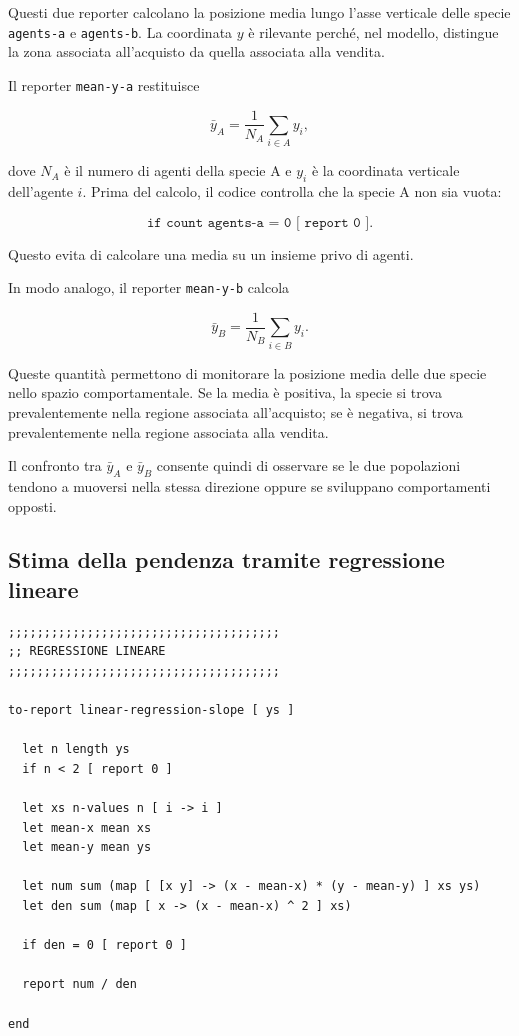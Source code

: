 Questi due reporter calcolano la posizione media lungo l'asse verticale delle
specie \texttt{agents-a} e \texttt{agents-b}. La coordinata \(y\) è rilevante
perché, nel modello, distingue la zona associata all'acquisto da quella associata
alla vendita.

Il reporter \texttt{mean-y-a} restituisce

\[
\bar{y}_A =
\frac{1}{N_A}
\sum_{i \in A} y_i,
\]

dove \(N_A\) è il numero di agenti della specie A e \(y_i\) è la coordinata
verticale dell'agente \(i\). Prima del calcolo, il codice controlla che la specie
A non sia vuota:

\[
\texttt{if count agents-a = 0 [ report 0 ]}.
\]

Questo evita di calcolare una media su un insieme privo di agenti.

In modo analogo, il reporter \texttt{mean-y-b} calcola

\[
\bar{y}_B =
\frac{1}{N_B}
\sum_{i \in B} y_i.
\]

Queste quantità permettono di monitorare la posizione media delle due specie
nello spazio comportamentale. Se la media è positiva, la specie si trova
prevalentemente nella regione associata all'acquisto; se è negativa, si trova
prevalentemente nella regione associata alla vendita.

Il confronto tra \(\bar{y}_A\) e \(\bar{y}_B\) consente quindi di osservare se le
due popolazioni tendono a muoversi nella stessa direzione oppure se sviluppano
comportamenti opposti.

\subsection{Stima della pendenza tramite regressione lineare}

\begin{lstlisting}[caption={Reporter per il calcolo della pendenza di una regressione lineare}]
;;;;;;;;;;;;;;;;;;;;;;;;;;;;;;;;;;;;;;
;; REGRESSIONE LINEARE
;;;;;;;;;;;;;;;;;;;;;;;;;;;;;;;;;;;;;;

to-report linear-regression-slope [ ys ]

  let n length ys
  if n < 2 [ report 0 ]

  let xs n-values n [ i -> i ]
  let mean-x mean xs
  let mean-y mean ys

  let num sum (map [ [x y] -> (x - mean-x) * (y - mean-y) ] xs ys)
  let den sum (map [ x -> (x - mean-x) ^ 2 ] xs)

  if den = 0 [ report 0 ]

  report num / den

end
\end{lstlisting}

